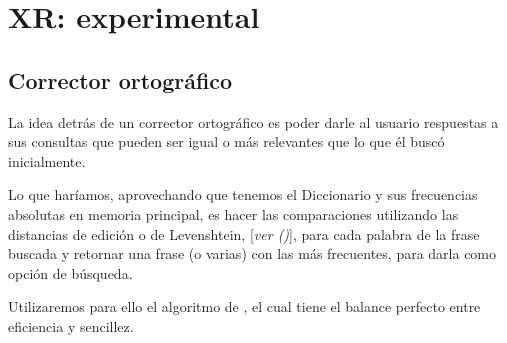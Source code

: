 \section{XR: experimental}

\subsection{Corrector ortográfico}

La idea detrás de un corrector ortográfico es poder darle al usuario respuestas a sus consultas que pueden ser igual o más relevantes que lo que él buscó inicialmente. 


Lo que haríamos, aprovechando que tenemos el Diccionario y sus frecuencias absolutas en memoria principal, es hacer las comparaciones utilizando las distancias de edición o de Levenshtein, [\textit{ver \citet[p.~58]{Manning:2008}(\citeyear{Manning:2008})}], para cada palabra de la frase buscada y retornar una frase (o varias) con las más frecuentes, para darla como opción de búsqueda.

Utilizaremos para ello el algoritmo de \citeauthor{norvigSP}, el cual tiene el balance perfecto entre eficiencia y sencillez.